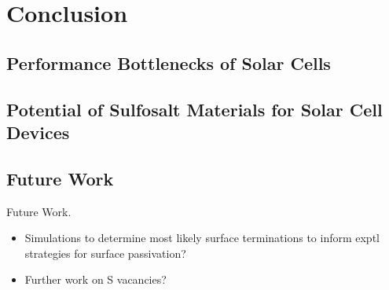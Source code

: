 
\chapter{Conclusion}

\label{ch:conclusions}

\section{Performance Bottlenecks of \CZTS Solar Cells}
\section{Potential of Sulfosalt Materials for Solar Cell Devices}

\section{Future Work}

Future Work.
\begin{itemize}
\item Simulations to determine most likely surface terminations to inform exptl strategies for surface passivation?
\item Further work on S vacancies?
\end{itemize}

 